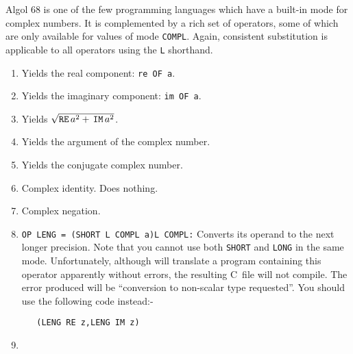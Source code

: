 Algol 68 is one of the few programming languages which have a
built-in mode for complex numbers. It is complemented by a rich set
of operators, some of which are only available for values of mode
\verb|COMPL|. Again, consistent substitution is applicable to all
operators using the \verb|L| shorthand.

\begin{enumerate}
\item {}\newline
Yields the real component: \verb|re OF a|.
\item {} \newline
Yields the imaginary component: \verb|im OF a|.
\item {} \newline
Yields $\sqrt{\mbox{\texttt{RE}}\,a^2+\,\mbox{\texttt{IM}}\,a^2}$.
\item {} \newline
Yields the argument of the complex number.
\item {} \newline
Yields the conjugate complex number.
\item {} \newline
Complex identity. Does nothing.
\item {} \newline
Complex negation.
\item {} \newline
\verb|OP LENG = (SHORT L COMPL a)L COMPL:| \newline
Converts its operand to the next longer precision. Note that you
cannot use both \verb|SHORT| and \verb|LONG| in the same mode.
Unfortunately, although  will
translate a program containing this operator apparently without
errors, the resulting C~file will not compile. The error produced
will be ``conversion to non-scalar type requested''. You should use
the following code instead:-
\begin{verbatim}
   (LENG RE z,LENG IM z)
\end{verbatim}
\item {} \newline

\end{enumerate}
